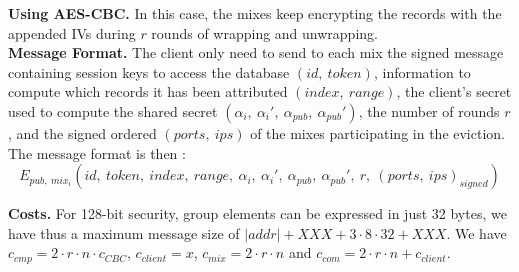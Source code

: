 \documentclass{llncs}
\begin{document}
\noindent\textbf{Using AES-CBC.} In this case, the mixes keep encrypting the records with the appended IVs during $r$ rounds of wrapping and unwrapping.\\

\noindent\textbf{Message Format.}
The client only need to send to each mix the signed message containing session keys to access the database $(id,\ token)$, information to compute which records it has been attributed $(index,\ range)$, the client's secret used to compute the shared secret $(\alpha_i,\ \alpha_i',\ \alpha_{pub},\ \alpha_{pub}')$, the number of rounds $r$, and the signed ordered $(ports,\ ips)$ of the mixes participating in the eviction.
The message format is then : $$E_{pub,\ mix_i}\left (id,\ token,\ index,\ range,\ \alpha_i,\ \alpha_i',\ \alpha_{pub},\ \alpha_{pub}',\ r,\ (port	s,\ ips)_{signed}\right )$$

\noindent\textbf{Costs.} For 128-bit security, group elements can be expressed in just 32 bytes, we have thus a maximum message size of $|addr|+XXX + 3 \cdot 8 \cdot 32 + XXX$. We have $c_{cmp} = 2\cdot r \cdot n \cdot c_{CBC}$, $c_{client}= x$, $c_{mix}= 2\cdot r \cdot n$ and $c_{com} = 2 \cdot r \cdot n+ c_{client}$.\\
\end{document}
